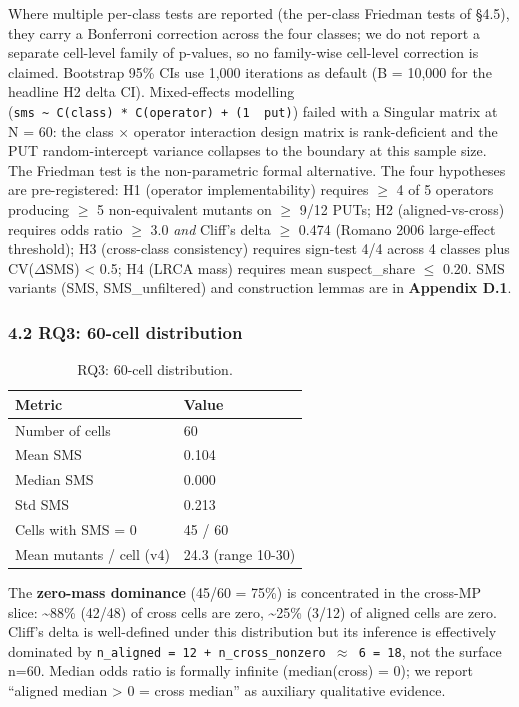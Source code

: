 \documentclass[review,12pt,authoryear]{elsarticle}
\begin{document}
Where multiple per-class tests are reported (the per-class Friedman tests
of §4.5), they carry a Bonferroni correction across the four classes; we
do not report a separate cell-level family of p-values, so no family-wise
cell-level correction is claimed. Bootstrap 95\% CIs use 1,000 iterations
as default (B = 10,000 for the headline H2 delta CI). Mixed-effects
modelling
(\texttt{sms\ \textasciitilde{}\ C(class)\ *\ C(operator)\ +\ (1\ \textbar{}\ put)})
failed with a Singular matrix at N = 60: the class $\times$ operator
interaction design matrix is rank-deficient and the PUT random-intercept
variance collapses to the boundary at this sample size. The Friedman test
is the non-parametric formal alternative. The four hypotheses are
pre-registered: H1 (operator implementability) requires $\geq$ 4 of 5
operators producing $\geq$ 5 non-equivalent mutants on $\geq$ 9/12 PUTs; H2
(aligned-vs-cross) requires odds ratio $\geq$ 3.0 \emph{and} Cliff's delta $\geq$
0.474 (Romano 2006 large-effect threshold); H3 (cross-class consistency)
requires sign-test 4/4 across 4 classes plus CV($\Delta$SMS) \textless{} 0.5;
H4 (LRCA mass) requires mean suspect\_share $\leq$ 0.20. SMS variants
(SMS, SMS\_unfiltered) and construction lemmas are in
\textbf{Appendix D.1}.

\subsubsection{4.2 RQ3: 60-cell distribution}\label{rq1-60-cell-distribution}

{\def\LTcaptype{table} %
\begin{longtable}[]{@{}ll@{}}
\caption{RQ3: 60-cell distribution.}\label{tab:p2-08}\\
\toprule\noalign{}
Metric & Value \\
\midrule\noalign{}
\endhead
\bottomrule\noalign{}
\endlastfoot
Number of cells & 60 \\
Mean SMS & 0.104 \\
Median SMS & 0.000 \\
Std SMS & 0.213 \\
Cells with SMS = 0 & 45 / 60 \\
Mean mutants / cell (v4) & 24.3 (range 10-30) \\
\end{longtable}
}

The \textbf{zero-mass dominance} (45/60 = 75\%) is concentrated in the
cross-MP slice: \textasciitilde88\% (42/48) of cross cells are zero,
\textasciitilde25\% (3/12) of aligned cells are zero. Cliff's delta is
well-defined under this distribution but its inference is effectively
dominated by
\texttt{n\_aligned\ =\ 12\ +\ n\_cross\_nonzero\ $\approx$\ 6\ =\ 18}, not the
surface n=60. Median odds ratio is formally infinite (median(cross) =
0); we report ``aligned median \textgreater{} 0 = cross median'' as
auxiliary qualitative evidence.
\end{document}
